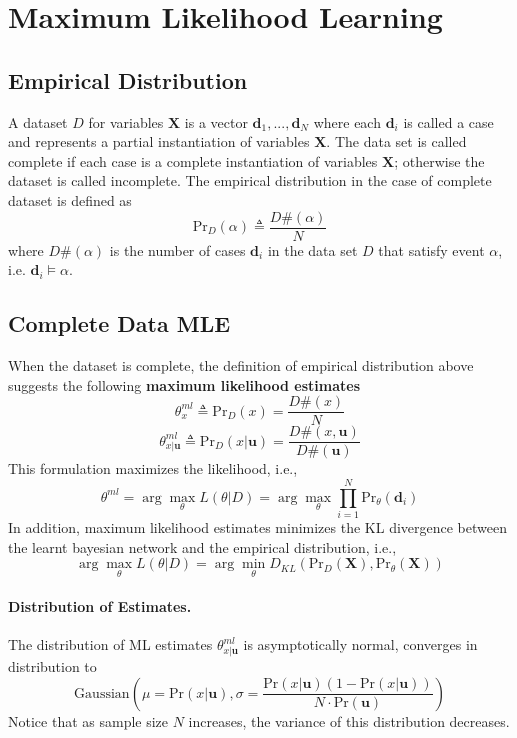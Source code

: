 \documentclass[11pt]{article}
\newcommand{\bd}{\mathbf{d}}
\newcommand{\bu}{\mathbf{u}}
\newcommand{\pr}{\mathrm{Pr}}
\begin{document}
\section{Maximum Likelihood Learning}
\subsection{Empirical Distribution}
A dataset $D$ for variables $\mathbf X$ is a vector $\bd_1, ..., \bd_N$ where each $\bd_i$ is called a case and represents a partial instantiation of variables $\mathbf X$. The data set is called complete if each case is a complete instantiation of variables $\mathbf X$; otherwise the dataset is called incomplete. The empirical distribution in the case of complete dataset is defined as
\begin{equation}
	\pr_D (\alpha ) \triangleq \frac{D\#(\alpha)}{N}
\end{equation}
where $D\#(\alpha)$ is the number of cases $\mathbf d_i$ in the data set $D$ that satisfy event $\alpha$, i.e.  $\bd_i \vDash \alpha$. 

\subsection{Complete Data MLE\label{sec:compete data mle}}
When the dataset is complete, the definition of empirical distribution above suggests the following \textbf{maximum likelihood estimates}
\begin{equation}
	\theta^{ml}_x \triangleq \pr_D(x) = \frac{D\#(x)}{N} 
\end{equation}
\begin{equation}
	\theta^{ml}_{x|\bu} \triangleq \pr_D (x | \bu) = \frac{D\# (x, \bu)}{D\# (\bu)}
\end{equation}
This formulation maximizes the likelihood, i.e., 
\begin{equation}
	\theta^{ml} = \arg\max _\theta L(\theta |D ) = \arg\max _\theta \prod_{i = 1}^N \pr_\theta (\bd_i)
\end{equation}
In addition, maximum likelihood estimates minimizes the KL divergence between the learnt bayesian network and the empirical distribution, i.e., 
\begin{equation}
	\arg\max_\theta L(\theta| D) = \arg\min_\theta D_{KL} (\pr_D (\mathbf X), \pr_\theta (\mathbf X))
\end{equation}

\paragraph{Distribution of Estimates.} The distribution of ML estimates $\theta_{x|\bu}^{ml}$ is asymptotically normal, converges in distribution to 
\begin{equation}
	\mathrm{Gaussian} \left ( 
	\mu = \pr(x | \bu ), \sigma = \frac{\pr(x | \bu) (1 - \pr(x | \bu)) }{N \cdot \pr(\bu) }
	\right) 
\end{equation}
Notice that as sample size $N$ increases, the variance of this distribution decreases. 
\end{document}
